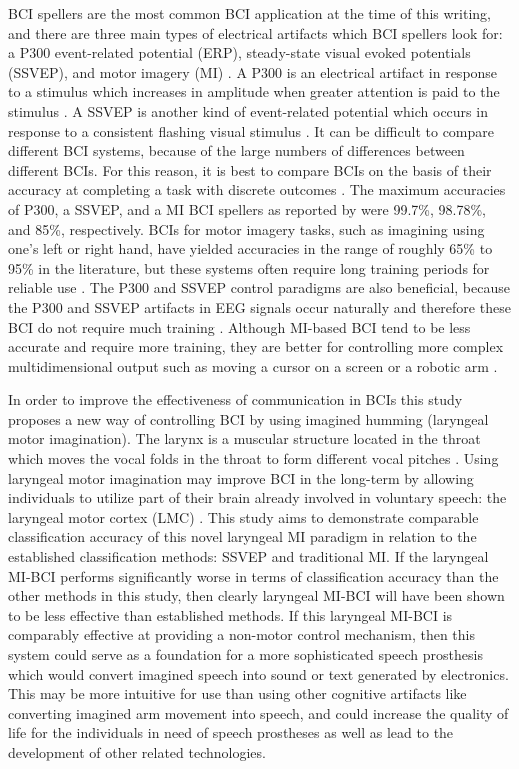 \documentclass{article}
\begin{document}
BCI spellers are the most common BCI application at the time of this writing, and there are three main types of electrical artifacts which BCI spellers look for: a P300 event-related potential (ERP), steady-state visual evoked potentials (SSVEP), and motor imagery (MI) \citep{Rezeika2018}. A P300 is an electrical artifact in response to a stimulus which increases in amplitude when greater attention is paid to the stimulus \citep{Shih2012}. A SSVEP is another kind of event-related potential which occurs in response to a consistent flashing visual stimulus \citep{Iscan2018}. It can be difficult to compare different BCI systems, because of the large numbers of differences between different BCIs. For this reason, it is best to compare BCIs on the basis of their accuracy at completing a task with discrete outcomes \citep{mowla2018bcihandbook}. The maximum accuracies of P300, a SSVEP, and a MI  BCI spellers as reported by \citet{Rezeika2018} were 99.7\%, 98.78\%, and 85\%, respectively. BCIs for motor imagery tasks, such as imagining using one's left or right hand, have yielded accuracies in the range of roughly 65\% to 95\% in the literature, but these systems often require long training periods for reliable use  \citep{quiles_low-cost_2020, irimia_high_2018}. The P300 and SSVEP control paradigms are also beneficial, because the P300 and SSVEP artifacts in EEG signals occur naturally and therefore these BCI do not require much training \citep{MCFARLAND2017194, Rezeika2018}. Although MI-based BCI tend to be less accurate and require more training, they are better for controlling more complex multidimensional output such as moving a cursor on a screen or a robotic arm \citep{MCFARLAND2017194}.

In order to improve the effectiveness of communication in BCIs this study proposes a new way of controlling BCI by using imagined humming (laryngeal motor imagination). The larynx is a muscular structure located in the throat which moves the vocal folds in the throat to form different vocal pitches \citep{10.3389/fnhum.2013.00237}. Using laryngeal motor imagination may improve BCI in the long-term by allowing individuals to utilize part of their brain already involved in voluntary speech: the laryngeal motor cortex (LMC) \citep{SIMONYAN201415}. This study aims to demonstrate comparable classification accuracy of this novel laryngeal MI paradigm in relation to the established classification methods: SSVEP and traditional MI. If the laryngeal MI-BCI performs significantly worse in terms of classification accuracy than the other methods in this study, then clearly laryngeal MI-BCI will have been shown to be less effective than established methods. If this laryngeal MI-BCI is comparably effective at providing a non-motor control mechanism, then this system could serve as a foundation for a more sophisticated speech prosthesis which would convert imagined speech into sound or text generated by electronics. This may be more intuitive for use than using other cognitive artifacts like converting imagined arm movement into speech, and could increase the quality of life for the individuals in need of speech prostheses as well as lead to the development of other related technologies.
\end{document}
